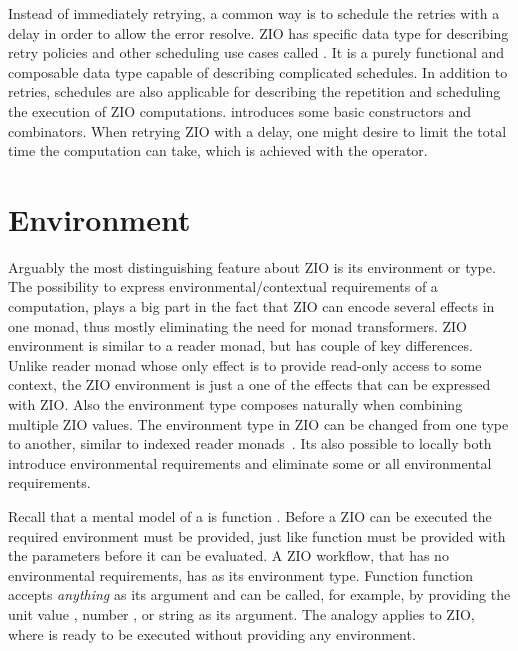 Instead of immediately retrying, a common way is to schedule the retries with a delay in order to allow the error resolve. ZIO has specific data type for describing retry policies and other scheduling use cases called . It is a purely functional and composable data type capable of describing complicated schedules. In addition to retries, schedules are also applicable for describing the repetition and scheduling the execution of ZIO computations.  introduces some basic  constructors and combinators. When retrying ZIO with a delay, one might desire to limit the total time the computation can take, which is achieved with the  operator.





\section{Environment}
Arguably the most distinguishing feature about ZIO is its environment or  type. The possibility to express environmental/contextual requirements of a computation, plays a big part in the fact that ZIO can encode several effects in one monad, thus mostly eliminating the need for monad transformers. ZIO environment is similar to a reader monad, but has couple of key differences. Unlike reader monad whose only effect is to provide read-only access to some context, the ZIO environment is just a one of the effects that can be expressed with ZIO. Also the environment type composes naturally when combining multiple ZIO values. The environment type in ZIO can be changed from one type to another, similar to indexed reader monads~\cite{monad-factory}. Its also possible to locally both introduce environmental requirements and eliminate some or all environmental requirements.

Recall that a mental model of a  is function .
Before a ZIO can be executed the required environment must be provided, just like function must be provided with the parameters before it can be evaluated. A ZIO workflow, that has no environmental requirements, has  as its environment type. Function  function accepts \textit{anything} as its argument and can be called, for example, by providing the unit value , number , or string  as its argument. The analogy applies to ZIO, where  is ready to be executed without providing any environment.

